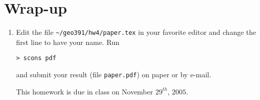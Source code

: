 \section{Wrap-up}

\begin{enumerate}  

\item 
Edit the file
\verb#~/geo391/hw4/paper.tex# in your favorite editor and 
change the first line to have your name. Run
\begin{verbatim}
> scons pdf
\end{verbatim}
and submit your result (file \texttt{paper.pdf}) on paper 
or by e-mail.

This homework is due in class on November $29^{th}$, $2005$.

\end{enumerate}
